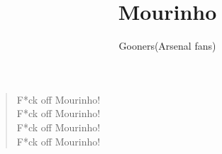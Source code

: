 \documentclass[a4paper,12pt]{article}
\title{Mourinho}
\author{Gooners(Arsenal fans)}
\date{}
\begin{document}
	
	\maketitle
	
	\begin{verse}
		
		F*ck off Mourinho! \\
		F*ck off Mourinho! \\
		F*ck off Mourinho! \\
		F*ck off Mourinho!
		
	\end{verse}
	
\end{document}
